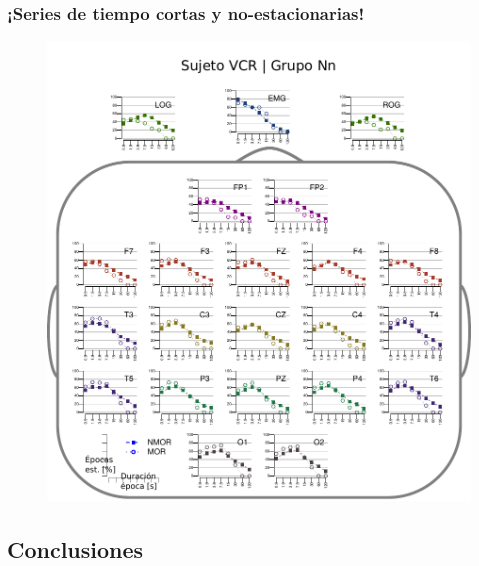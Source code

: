 \documentclass[serif,mathserif,professionalfont]{beamer}
\begin{document}
\begin{frame}\frametitle{¡Series de tiempo cortas y no-estacionarias!}
\begin{figure}
\centering
\includegraphics[width=.55\linewidth]{./img_resultados/cabeza_VCR.pdf}
\end{figure}
\end{frame}




\subsection{Conclusiones}
\end{document}
